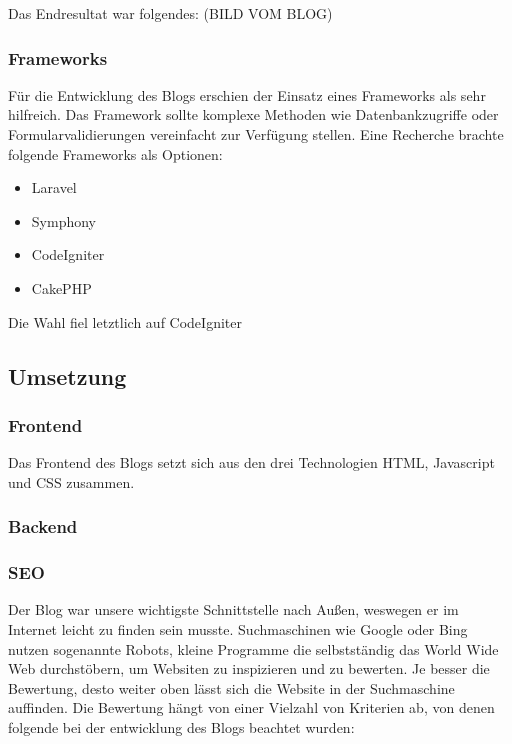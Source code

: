     Das Endresultat war folgendes:
    (BILD VOM BLOG)
    \subsubsection{Frameworks}
    Für die Entwicklung des Blogs erschien der Einsatz eines Frameworks als sehr hilfreich. Das Framework sollte komplexe Methoden wie
    Datenbankzugriffe oder Formularvalidierungen vereinfacht zur Verfügung stellen. Eine Recherche brachte folgende Frameworks als
    Optionen:
    \begin{itemize}
      \item Laravel
      \item Symphony
      \item CodeIgniter
      \item CakePHP
    \end{itemize}

    Die Wahl fiel letztlich auf CodeIgniter
  \subsection{Umsetzung}

    \subsubsection{Frontend}
    Das Frontend des Blogs setzt sich aus den drei Technologien HTML, Javascript und CSS zusammen.

    \subsubsection{Backend}

    \subsubsection{SEO}
    Der Blog war unsere wichtigste Schnittstelle nach Außen, weswegen er im Internet leicht zu finden sein musste. Suchmaschinen wie Google oder Bing nutzen
    sogenannte Robots, kleine Programme die selbstständig das World Wide Web durchstöbern, um Websiten zu inspizieren und zu bewerten. Je besser die Bewertung,
    desto weiter oben lässt sich die Website in der Suchmaschine auffinden.
    Die Bewertung hängt von einer Vielzahl von Kriterien ab, von denen folgende bei der entwicklung des Blogs beachtet wurden:

